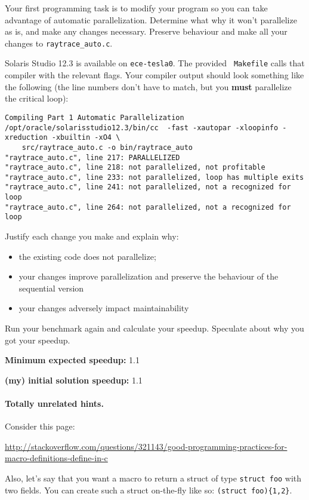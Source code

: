 \documentclass[letterpaper,10pt]{article}
\begin{document}
Your first programming task is to modify your program so you can take
advantage of automatic parallelization. Determine what why it won't
parallelize as is, and make any changes necessary. Preserve behaviour
and make all your changes to {\tt raytrace\_auto.c}.

Solaris Studio 12.3 is available on {\tt ece-tesla0}. The provided {\tt
  Makefile} calls that compiler with the relevant flags. Your compiler
output should look something like the following (the line numbers
don't have to match, but you {\bf must} parallelize the critical loop):

\newpage
\begin{lstlisting}
Compiling Part 1 Automatic Parallelization
/opt/oracle/solarisstudio12.3/bin/cc  -fast -xautopar -xloopinfo -xreduction -xbuiltin -xO4 \
    src/raytrace_auto.c -o bin/raytrace_auto
"raytrace_auto.c", line 217: PARALLELIZED
"raytrace_auto.c", line 218: not parallelized, not profitable
"raytrace_auto.c", line 233: not parallelized, loop has multiple exits
"raytrace_auto.c", line 241: not parallelized, not a recognized for loop
"raytrace_auto.c", line 264: not parallelized, not a recognized for loop
\end{lstlisting}

Justify each change you make and explain why:
\begin{itemize}
\item the existing code does not parallelize;
\item your changes improve parallelization and preserve the behaviour of the sequential version
\item your changes adversely impact maintainability
\end{itemize}

Run your benchmark again and calculate your speedup. Speculate about why you got your speedup.

\squishlist
  \item {\bf Minimum expected speedup:} 1.1
  \item {\bf (my) initial solution speedup:} 1.1
\squishend

\paragraph{Totally unrelated hints.} Consider this page:
\begin{center}
  \scriptsize \url{http://stackoverflow.com/questions/321143/good-programming-practices-for-macro-definitions-define-in-c}
\end{center}
Also, let's say that you want a macro to return a struct of type {\tt struct foo} with
two fields. You can create such a struct on-the-fly like so: \verb!(struct foo){1,2}!.
\end{document}
